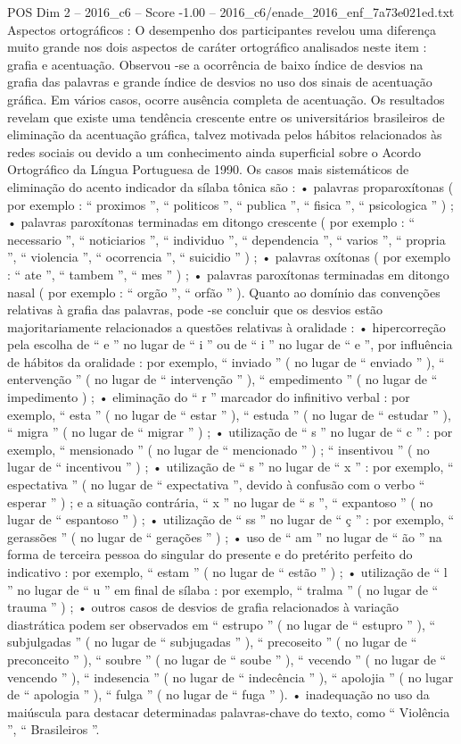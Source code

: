 \begin{textsample}{POS Dim 2 – 2016\_c6 – Score -1.00 – 2016\_c6/enade\_2016\_enf\_7a73e021ed.txt}
Aspectos ortográficos : O desempenho dos participantes revelou uma diferença muito grande nos dois aspectos de caráter ortográfico analisados neste item : grafia e acentuação.
Observou -se a ocorrência de baixo índice de desvios na grafia das palavras e grande índice de desvios no uso dos sinais de acentuação gráfica.
Em vários casos, ocorre ausência completa de acentuação.
Os resultados revelam que existe uma tendência crescente entre os universitários brasileiros de eliminação da acentuação gráfica, talvez motivada pelos hábitos relacionados às redes sociais ou devido a um conhecimento ainda superficial sobre o Acordo Ortográfico da Língua Portuguesa de 1990.
Os casos mais sistemáticos de eliminação do acento indicador da sílaba tônica são : • palavras proparoxítonas ( por exemplo : “ proximos ”, “ politicos ”, “ publica ”, “ fisica ”, “ psicologica ” ) ; • palavras paroxítonas terminadas em ditongo crescente ( por exemplo : “ necessario ”, “ noticiarios ”, “ individuo ”, “ dependencia ”, “ varios ”, “ propria ”, “ violencia ”, “ ocorrencia ”, “ suicidio ” ) ; • palavras oxítonas ( por exemplo : “ ate ”, “ tambem ”, “ mes ” ) ; • palavras paroxítonas terminadas em ditongo nasal ( por exemplo : “ orgão ”, “ orfão ” ).
Quanto ao domínio das convenções relativas à grafia das palavras, pode -se concluir que os desvios estão majoritariamente relacionados a questões relativas à oralidade : • hipercorreção pela escolha de “ e ” no lugar de “ i ” ou de “ i ” no lugar de “ e ”, por influência de hábitos da oralidade : por exemplo, “ inviado ” ( no lugar de “ enviado ” ), “ entervenção ” ( no lugar de “ intervenção ” ), “ empedimento ” ( no lugar de “ impedimento ) ; • eliminação do “ r ” marcador do infinitivo verbal : por exemplo, “ esta ” ( no lugar de “ estar ” ), “ estuda ” ( no lugar de “ estudar ” ), “ migra ” ( no lugar de “ migrar ” ) ; • utilização de “ s ” no lugar de “ c ” : por exemplo, “ mensionado ” ( no lugar de “ mencionado ” ) ; “ insentivou ” ( no lugar de “ incentivou ” ) ; • utilização de “ s ” no lugar de “ x ” : por exemplo, “ espectativa ” ( no lugar de “ expectativa ”, devido à confusão com o verbo “ esperar ” ) ; e a situação contrária, “ x ” no lugar de “ s ”, “ expantoso ” ( no lugar de “ espantoso ” ) ; • utilização de “ ss ” no lugar de “ ç ” : por exemplo, “ gerassões ” ( no lugar de “ gerações ” ) ; • uso de “ am ” no lugar de “ ão ” na forma de terceira pessoa do singular do presente e do pretérito perfeito do indicativo : por exemplo, “ estam ” ( no lugar de “ estão ” ) ; • utilização de “ l ” no lugar de “ u ” em final de sílaba : por exemplo, “ tralma ” ( no lugar de “ trauma ” ) ; • outros casos de desvios de grafia relacionados à variação diastrática podem ser observados em “ estrupo ” ( no lugar de “ estupro ” ), “ subjulgadas ” ( no lugar de “ subjugadas ” ), “ precoseito ” ( no lugar de “ preconceito ” ), “ soubre ” ( no lugar de “ soube ” ), “ vecendo ” ( no lugar de “ vencendo ” ), “ indesencia ” ( no lugar de “ indecência ” ), “ apolojia ” ( no lugar de “ apologia ” ), “ fulga ” ( no lugar de “ fuga ” ). • inadequação no uso da maiúscula para destacar determinadas palavras-chave do texto, como “ Violência ”, “ Brasileiros ”.

\end{textsample}
